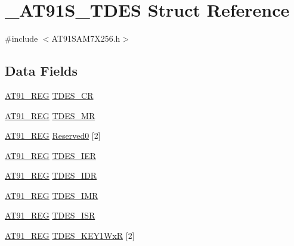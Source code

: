 \hypertarget{struct__AT91S__TDES}{\section{\-\_\-\-A\-T91\-S\-\_\-\-T\-D\-E\-S Struct Reference}
\label{struct__AT91S__TDES}
}


{\ttfamily \#include $<$A\-T91\-S\-A\-M7\-X256.\-h$>$}

\subsection*{Data Fields}
\begin{DoxyCompactItemize}
\item 
\hyperlink{GCC_2ARM7__AT91SAM7S_2AT91SAM7X256_8h_a712ad5a1ac1bd02f3e95a7526c283ce1}{A\-T91\-\_\-\-R\-E\-G} \hyperlink{struct__AT91S__TDES_a7b48f8c1a3bf999c41c0081813b4a75b}{T\-D\-E\-S\-\_\-\-C\-R}
\item 
\hyperlink{GCC_2ARM7__AT91SAM7S_2AT91SAM7X256_8h_a712ad5a1ac1bd02f3e95a7526c283ce1}{A\-T91\-\_\-\-R\-E\-G} \hyperlink{struct__AT91S__TDES_a8962dd4d8dd09c236b10c035683fe22f}{T\-D\-E\-S\-\_\-\-M\-R}
\item 
\hyperlink{GCC_2ARM7__AT91SAM7S_2AT91SAM7X256_8h_a712ad5a1ac1bd02f3e95a7526c283ce1}{A\-T91\-\_\-\-R\-E\-G} \hyperlink{struct__AT91S__TDES_ae278e1b11eb4e18dea18c099e6a9eb5c}{Reserved0} \mbox{[}2\mbox{]}
\item 
\hyperlink{GCC_2ARM7__AT91SAM7S_2AT91SAM7X256_8h_a712ad5a1ac1bd02f3e95a7526c283ce1}{A\-T91\-\_\-\-R\-E\-G} \hyperlink{struct__AT91S__TDES_a22d098ef906e1e524e762a202d5dc27d}{T\-D\-E\-S\-\_\-\-I\-E\-R}
\item 
\hyperlink{GCC_2ARM7__AT91SAM7S_2AT91SAM7X256_8h_a712ad5a1ac1bd02f3e95a7526c283ce1}{A\-T91\-\_\-\-R\-E\-G} \hyperlink{struct__AT91S__TDES_a12b83111ccac647664613ab4b4b8281f}{T\-D\-E\-S\-\_\-\-I\-D\-R}
\item 
\hyperlink{GCC_2ARM7__AT91SAM7S_2AT91SAM7X256_8h_a712ad5a1ac1bd02f3e95a7526c283ce1}{A\-T91\-\_\-\-R\-E\-G} \hyperlink{struct__AT91S__TDES_ad4ddcccc04c725741459056df6041e3c}{T\-D\-E\-S\-\_\-\-I\-M\-R}
\item 
\hyperlink{GCC_2ARM7__AT91SAM7S_2AT91SAM7X256_8h_a712ad5a1ac1bd02f3e95a7526c283ce1}{A\-T91\-\_\-\-R\-E\-G} \hyperlink{struct__AT91S__TDES_a3edbcfd3d98eacb37e846486fe2a6625}{T\-D\-E\-S\-\_\-\-I\-S\-R}
\item 
\hyperlink{GCC_2ARM7__AT91SAM7S_2AT91SAM7X256_8h_a712ad5a1ac1bd02f3e95a7526c283ce1}{A\-T91\-\_\-\-R\-E\-G} \hyperlink{struct__AT91S__TDES_a8e5d938d7b7470211b54d08255841b5d}{T\-D\-E\-S\-\_\-\-K\-E\-Y1\-Wx\-R} \mbox{[}2\mbox{]}

\end{DoxyCompactItemize}

